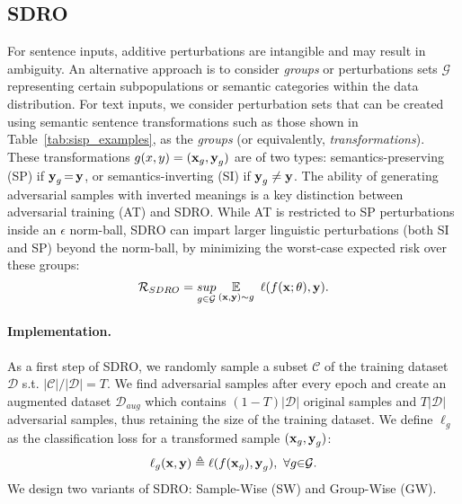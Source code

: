 \subsection{SDRO}
\label{sec:sdro}
For sentence inputs, additive perturbations are intangible and may result in ambiguity.
An alternative approach is to consider \textit{groups} or perturbations sets $\mathcal{G}$ representing certain subpopulations or semantic categories within the data distribution.
For text inputs, we consider perturbation sets that can be created using semantic sentence transformations such as those shown in Table~\ref{tab:sisp_examples}, as the \textit{groups} (or equivalently, \textit{transformations}).
These transformations $g(x, y) = (\operatorname{\mathbf{x}}_g, \operatorname{\mathbf{y}}_g)$ are of two types:
semantics-preserving (SP) if $\operatorname{\mathbf{y}}_g{=}\operatorname{\mathbf{y}}$, or semantics-inverting (SI) if $\operatorname{\mathbf{y}}_g \neq \operatorname{\mathbf{y}}$.
The ability of generating adversarial samples with inverted meanings is a key distinction between adversarial training (AT) and SDRO.
While AT is restricted to SP perturbations inside an $\epsilon$ norm-ball, SDRO can impart larger linguistic perturbations (both SI and SP) beyond the norm-ball, by minimizing the worst-case expected risk over these groups:
\begin{equation}
    \mathcal{R}_{SDRO} = \underset{g\in\mathcal{G}}{sup}\operatorname*{\mathbb{E}}_{(\operatorname{\mathbf{x}}, \operatorname{\mathbf{y}}) \sim g} ~\ell(f(\operatorname{\mathbf{x}}; \theta), \operatorname{\mathbf{y}}).
    \label{sdro:eq:sdro}
\end{equation}


\paragraph{Implementation.}
As a first step of SDRO, we randomly sample a subset $\mathcal{C}$ of the training dataset $\mathcal{D}$ s.t. $|\mathcal{C}|/|\mathcal{D}|=T$. 
We find adversarial samples after every epoch and create an augmented dataset $\mathcal{D}_{aug}$ which contains $(1-T)|\mathcal{D}|$ original samples and $T|\mathcal{D}|$ adversarial samples, thus retaining the size of the training dataset.
We define $\ell_g$ as the classification loss for a transformed sample $(\operatorname{\mathbf{x}}_g, \operatorname{\mathbf{y}}_g)$:
\begin{equation}
    \ell_g(\operatorname{\mathbf{x}}, \operatorname{\mathbf{y}}) \triangleq \ell(f(\operatorname{\mathbf{x}}_g), \operatorname{\mathbf{y}}_g),~\forall g{\in}\mathcal{G}.
    \label{sdro:eq:ell_G}
\end{equation}
We design two variants of SDRO: Sample-Wise (SW) and Group-Wise (GW).
